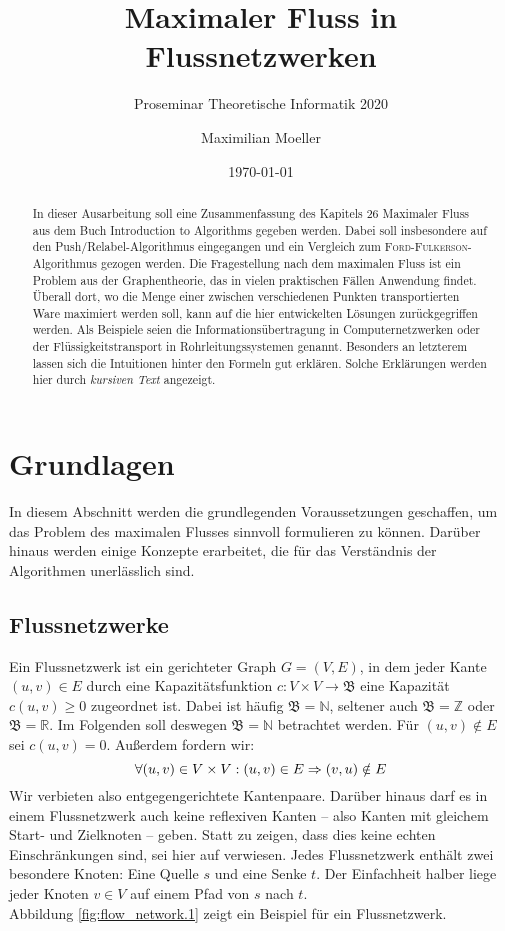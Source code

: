 \documentclass[12pt,a4paper,titlepage,onecolumn,ngerman]{scrartcl}
\author{Maximilian Moeller}
\title{Maximaler Fluss in Flussnetzwerken}
\subtitle{Proseminar Theoretische Informatik 2020}
\date{\today}
\theoremstyle{definition}
\theoremstyle{remark}
\newcommand{\ff}{\textsc{Ford-Fulkerson}}
\newcommand{\pr}{Push/Relabel}
\begin{document}
\maketitle
\nocite{*}

\tableofcontents

\begin{abstract}
In dieser Ausarbeitung soll eine Zusammenfassung des Kapitels 26 \glqq Maximaler Fluss\grqq{} aus dem Buch \glqq Introduction to Algorithms\grqq{} \parencite{Cormen09} gegeben werden. 
Dabei soll insbesondere auf den \pr -Algorithmus eingegangen und ein Vergleich zum \ff -Algorithmus gezogen werden.
\medbreak
Die Fragestellung nach dem maximalen Fluss ist ein Problem aus der Graphentheorie, das
in vielen praktischen Fällen Anwendung findet. 
Überall dort, wo die Menge einer zwischen verschiedenen Punkten transportierten Ware maximiert werden soll, kann auf die hier entwickelten Lösungen zurückgegriffen werden. 
Als Beispiele seien die Informationsübertragung in Computernetzwerken oder der Flüssigkeitstransport in Rohrleitungssystemen genannt. 
Besonders an letzterem lassen sich die Intuitionen hinter den Formeln gut erklären. Solche Erklärungen werden hier durch \textit{kursiven Text} angezeigt.
\end{abstract}

\section{Grundlagen}
In diesem Abschnitt werden die grundlegenden Voraussetzungen geschaffen, um das Problem des maximalen Flusses sinnvoll formulieren zu können.
Darüber hinaus werden einige Konzepte erarbeitet, die für das Verständnis der Algorithmen unerlässlich sind.

\subsection{Flussnetzwerke}
Ein Flussnetzwerk ist ein gerichteter Graph $G = (V,E)$, in dem jeder Kante $(u,v) \in E$ durch eine Kapazitätsfunktion $c: V\times V\to\mathfrak{B}$ eine Kapazität $c(u,v) \geq 0$ zugeordnet ist.
Dabei ist häufig $\mathfrak{B} = \mathbb{N}$, seltener auch $\mathfrak{B} = \mathbb{Z}$ oder $\mathfrak{B} = \mathbb{R}$.
Im Folgenden soll deswegen $\mathfrak{B} = \mathbb{N}$ betrachtet werden.
Für $(u,v) \notin E$ sei $c(u,v) = 0$.
Außerdem fordern wir:
\begin{equation} \label{no_parallel}
\forall (u,v)\in V\times V: (u,v)\in E \Rightarrow (v,u)\notin E\\
\end{equation}
Wir verbieten also entgegengerichtete Kantenpaare.
Darüber hinaus darf es in einem Flussnetzwerk auch keine reflexiven Kanten -- also Kanten mit gleichem Start- und Zielknoten -- geben.
Statt zu zeigen, dass dies keine echten Einschränkungen sind, sei hier auf \cite[][S. 724 f.]{Cormen09} verwiesen.
\medbreak
Jedes Flussnetzwerk enthält zwei besondere Knoten: Eine Quelle $s$ und eine Senke $t$.
Der Einfachheit halber liege jeder Knoten $v \in V$ auf einem Pfad von $s$ nach $t$.\\
Abbildung \ref{fig:flow_network.1} zeigt ein Beispiel für ein Flussnetzwerk.
\end{document}
